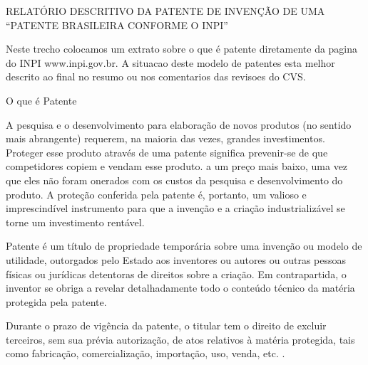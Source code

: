 \documentclass[12pt]{article}
\begin{document}
\linenumbers

\noitemsep
\renewcommand\linenumberfont{\normalfont\small}
\setlength{\linenumbersep}{1cm}



\large


RELATÓRIO DESCRITIVO DA PATENTE DE INVENÇÃO DE UMA  ``PATENTE
  BRASILEIRA CONFORME O INPI''

\normalsize





Neste trecho colocamos um extrato sobre o que é patente diretamente da
pagina do INPI www.inpi.gov.br. A situacao deste modelo de patentes
esta melhor descrito ao final no resumo ou nos comentarios das
revisoes do CVS.


O que é Patente

A pesquisa e o desenvolvimento para elaboração de novos produtos (no
sentido mais abrangente) requerem, na maioria das vezes, grandes
investimentos. Proteger esse produto através de uma patente significa
prevenir-se de que competidores copiem e vendam esse produto. a um
preço mais baixo, uma vez que eles não foram onerados com os custos da
pesquisa e desenvolvimento do produto. A proteção conferida pela
patente é, portanto, um valioso e imprescindível instrumento para que
a invenção e a criação industrializável se torne um investimento
rentável.

Patente é um título de propriedade temporária sobre uma invenção ou
modelo de utilidade, outorgados pelo Estado aos inventores ou autores
ou outras pessoas físicas ou jurídicas detentoras de direitos sobre a
criação. Em contrapartida, o inventor se obriga a revelar
detalhadamente todo o conteúdo técnico da matéria protegida pela
patente.

Durante o prazo de vigência da patente, o titular tem o direito de
excluir terceiros, sem sua prévia autorização, de atos relativos à
matéria protegida, tais como fabricação, comercialização, importação,
uso, venda, etc. .
\end{document}
